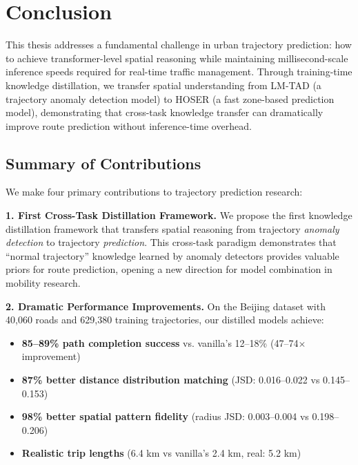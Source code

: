 
\section{Conclusion}
\label{sec:conclusion}

This thesis addresses a fundamental challenge in urban trajectory prediction: how to achieve transformer-level spatial reasoning while maintaining millisecond-scale inference speeds required for real-time traffic management. Through training-time knowledge distillation, we transfer spatial understanding from LM-TAD (a trajectory anomaly detection model) to HOSER (a fast zone-based prediction model), demonstrating that cross-task knowledge transfer can dramatically improve route prediction without inference-time overhead.

\subsection{Summary of Contributions}
\label{sec:conclusion-contributions}

We make four primary contributions to trajectory prediction research:

\textbf{1. First Cross-Task Distillation Framework.} We propose the first knowledge distillation framework that transfers spatial reasoning from trajectory \emph{anomaly detection} to trajectory \emph{prediction}. This cross-task paradigm demonstrates that ``normal trajectory'' knowledge learned by anomaly detectors provides valuable priors for route prediction, opening a new direction for model combination in mobility research.

\textbf{2. Dramatic Performance Improvements.} On the Beijing dataset with 40,060 roads and 629,380 training trajectories, our distilled models achieve:
\begin{itemize}[noitemsep,topsep=0pt]
    \item \textbf{85--89\% path completion success} vs. vanilla's 12--18\% (47--74$\times$ improvement)
    \item \textbf{87\% better distance distribution matching} (JSD: 0.016--0.022 vs 0.145--0.153)
    \item \textbf{98\% better spatial pattern fidelity} (radius JSD: 0.003--0.004 vs 0.198--0.206)
    \item \textbf{Realistic trip lengths} (6.4 km vs vanilla's 2.4 km, real: 5.2 km)
\end{itemize}


